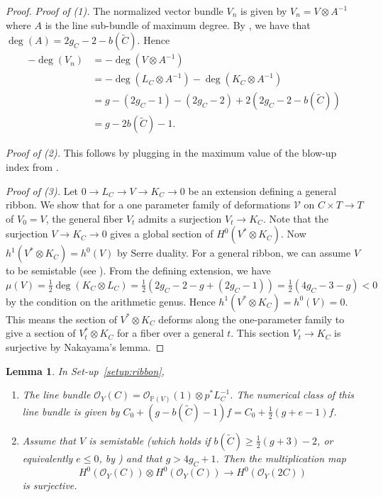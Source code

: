 \documentclass[11pt,reqno]{amsart}
\theoremstyle{plain}
\newtheorem{lemma}[theorem]{Lemma}
\theoremstyle{definition}
\newcommand{\PP}{\mathbb{P}}
\newcommand{\OO}{\mathcal{O}}
\newcommand{\Ct}{\widetilde{C}}
\begin{document}
\begin{proof}
\emph{Proof of (1).} The normalized vector bundle $V_n$ is given by $V_n=V\otimes A^{-1}$ where $A$ is the line sub-bundle of maximum degree. By \cite[Proposition~4.4]{DM24}, we have that $\deg(A)=2g_C-2-b(\Ct)$. Hence
\begin{align*}
-\deg(V_n)&=-\deg(V\otimes A^{-1})\\
&=-\deg(L_C\otimes A^{-1})-\deg(K_C\otimes A^{-1})\\
&=g-(2g_C-1)-(2g_C-2)+2(2g_C-2-b(\Ct))\\
&=g-2b(\Ct)-1 .
\end{align*}

\emph{Proof of (2).} This follows by plugging in the maximum value of the blow-up index from \cite[Corollary~4.3]{DM24}.

\emph{Proof of (3).} Let $0\to L_C\to V\to K_C\to0$ be an extension defining a general ribbon. We show that for a one parameter family of deformations $\mathcal V$ on $C\times T\to T$ of $V_0=V$, the general fiber $V_t$ admits a surjection $V_t\to K_C$. Note that the surjection $V\to K_C\to0$ gives a global section of $H^0(V^*\otimes K_C)$. Now $h^1(V^*\otimes K_C)=h^0(V)$ by Serre duality. For a general ribbon, we can assume $V$ to be semistable (see \cite[Corollary~4.5]{DM24}). From the defining extension, we have $\mu(V)=\frac12\deg(K_C\otimes L_C)=\frac12(2g_C-2-g+(2g_C-1))=\frac12(4g_C-3-g)<0$ by the condition on the arithmetic genus. Hence $h^1(V^*\otimes K_C)=h^0(V)=0$. This means the section of $V^*\otimes K_C$ deforms along the one-parameter family to give a section of $V_t^*\otimes K_C$ for a fiber over a general $t$. This section $V_t\to K_C$ is surjective by Nakayama's lemma.
\end{proof}

\begin{lemma}\label{lem:OSC}
In Set-up~\ref{setup:ribbon},
\begin{enumerate}
\item The line bundle $\OO_Y(C)=\OO_{\PP(V)}(1)\otimes p^*L_C^{-1}$. The numerical class of this line bundle is given by $C_0+(g-b(\Ct)-1)f=C_0+\frac12(g+e-1)f$.
\item Assume that $V$ is semistable (which holds if $b(\Ct)\ge\frac12(g+3)-2$, or equivalently $e\le0$, by \cite[Corollary~4.5]{DM24}) and that $g>4g_C+1$. Then the multiplication map
\[
H^0(\OO_Y(C))\otimes H^0(\OO_Y(C))\to H^0(\OO_Y(2C))
\]
is surjective.
\end{enumerate}
\end{lemma}
\end{document}
